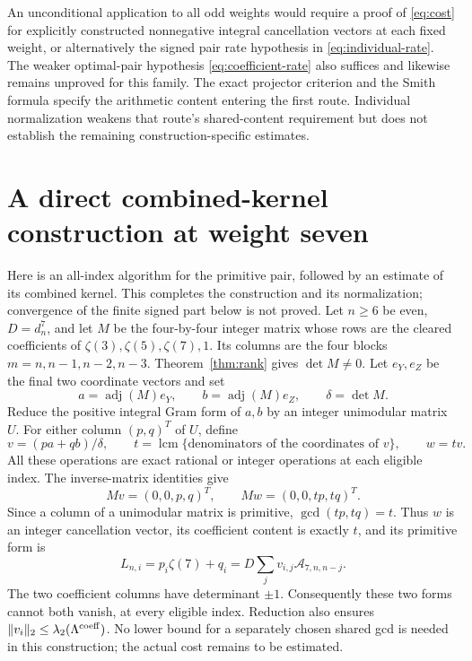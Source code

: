 \documentclass[11pt]{article}
\theoremstyle{remark}
\newcommand{\cA}{\mathcal A}
\begin{document}
An unconditional application to all odd weights would require a proof
of \eqref{eq:cost} for explicitly constructed nonnegative integral
cancellation vectors at each fixed weight, or alternatively the signed
pair rate hypothesis in \eqref{eq:individual-rate}.
The weaker optimal-pair hypothesis \eqref{eq:coefficient-rate} also
suffices and likewise remains unproved for this family.
The exact projector criterion and the Smith formula specify the
arithmetic content entering the first route. Individual normalization
weakens that route's shared-content requirement but does not establish
the remaining construction-specific estimates.

\section{A direct combined-kernel construction at weight seven}
\label{sec:combined-seven}
Here is an all-index algorithm for the primitive pair, followed by an
estimate of its combined kernel. This completes the construction and its
normalization; convergence of the finite signed part below is not proved.
Let \(n\ge6\) be even, \(D=d_n^7\), and let \(M\) be the four-by-four
integer matrix whose rows are the cleared coefficients of
\(\zeta(3),\zeta(5),\zeta(7),1\). Its columns are the four blocks
\(m=n,n-1,n-2,n-3\). Theorem~\ref{thm:rank} gives \(\det M\ne0\).
Let \(e_Y,e_Z\) be the final two coordinate vectors and set
\[
 a=\operatorname{adj}(M)e_Y,\qquad b=\operatorname{adj}(M)e_Z,
 \qquad \delta=\det M.
\]
Reduce the positive integral Gram form of \(a,b\) by an integer
unimodular matrix \(U\). For either column \((p,q)^T\) of \(U\), define
\[
 v=(pa+qb)/\delta,\qquad
 t=\operatorname{lcm}\{\text{denominators of the coordinates of }v\},
 \qquad w=tv.
\]
All these operations are exact rational or integer operations at each
eligible index. The inverse-matrix identities give
\[
 Mv=(0,0,p,q)^T,\qquad Mw=(0,0,tp,tq)^T.
\]
Since a column of a unimodular matrix is primitive,
\(\gcd(tp,tq)=t\). Thus \(w\) is an integer cancellation vector,
its coefficient content is exactly \(t\), and its primitive form is
\[
 L_{n,i}=p_i\zeta(7)+q_i=D\sum_jv_{i,j}\cA_{7,n,n-j}.
\]
The two coefficient columns have determinant \(\pm1\). Consequently
these two forms cannot both vanish, at every eligible index. Reduction
also ensures \(\|v_i\|_2\le\lambda_2(\Lambda^{\rm coeff})\).
No lower bound for a separately chosen shared gcd is needed in this
construction; the actual cost remains to be estimated.
\end{document}
